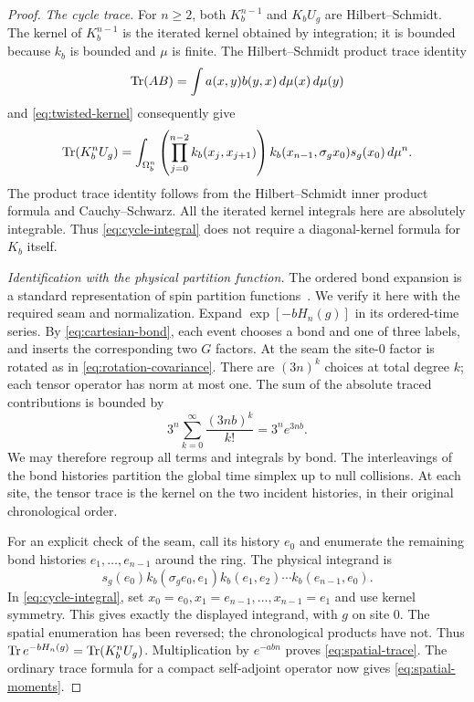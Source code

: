 \begin{proof}
\emph{The cycle trace.}
For $n\ge2$, both $K_b^{n-1}$ and $K_bU_g$ are Hilbert--Schmidt.
The kernel of $K_b^{n-1}$ is the iterated kernel obtained by integration;
it is bounded because $k_b$ is bounded and $\mu$ is finite. The
Hilbert--Schmidt product trace identity
\[
 \operatorname{Tr}(AB)=\int a(x,y)b(y,x)\,d\mu(x)\,d\mu(y)
\]
and \eqref{eq:twisted-kernel} consequently give
\begin{equation}\label{eq:cycle-integral}
 \operatorname{Tr}(K_b^nU_g)=
 \int_{\Omega_b^n}
 \left(\prod_{j=0}^{n-2}k_b(x_j,x_{j+1})\right)
 k_b(x_{n-1},\sigma_gx_0)s_g(x_0)\,d\mu^n.
\end{equation}
The product trace identity follows from the Hilbert--Schmidt inner
product formula and Cauchy--Schwarz. All the iterated kernel integrals
here are absolutely integrable. Thus \eqref{eq:cycle-integral} does not
require a diagonal-kernel formula for $K_b$ itself.

\emph{Identification with the physical partition function.}
The ordered bond expansion is a standard representation of spin
partition functions~\cite[arXiv v1, Section~2.2, Equations~(2.10)--(2.12)]{AizenmanNachtergaele1994}.
We verify it here with the required seam and normalization.
Expand $\exp[-bH_n(g)]$ in its ordered-time series. By
\eqref{eq:cartesian-bond}, each event chooses a bond and one of three
labels, and inserts the corresponding two $G$ factors. At the seam the
site-$0$ factor is rotated as in \eqref{eq:rotation-covariance}.
There are $(3n)^k$ choices at total degree $k$; each tensor operator has
norm at most one. The sum of the absolute traced contributions is bounded
by
\begin{equation}\label{eq:history-absolute}
 3^n\sum_{k=0}^\infty\frac{(3nb)^k}{k!}=3^ne^{3nb}.
\end{equation}
We may therefore regroup all terms and integrals by bond. The
interleavings of the bond histories partition the global time simplex
up to null collisions. At each site, the tensor trace is the kernel on
the two incident histories, in their original chronological order.

For an explicit check of the seam, call its history $e_0$ and enumerate
the remaining bond histories $e_1,\ldots,e_{n-1}$ around the ring. The
physical integrand is
\[
 s_g(e_0)k_b(\sigma_ge_0,e_1)
 k_b(e_1,e_2)\cdots k_b(e_{n-1},e_0).
\]
In \eqref{eq:cycle-integral}, set
$x_0=e_0,x_1=e_{n-1},\ldots,x_{n-1}=e_1$ and use kernel symmetry.
This gives exactly the displayed integrand, with $g$ on site $0$.
The spatial enumeration has been reversed; the chronological products
have not. Thus $\operatorname{Tr} e^{-bH_n(g)}=\operatorname{Tr}(K_b^nU_g)$. Multiplication by
$e^{-abn}$ proves \eqref{eq:spatial-trace}. The ordinary trace formula
for a compact self-adjoint operator now gives
\eqref{eq:spatial-moments}.
\end{proof}


